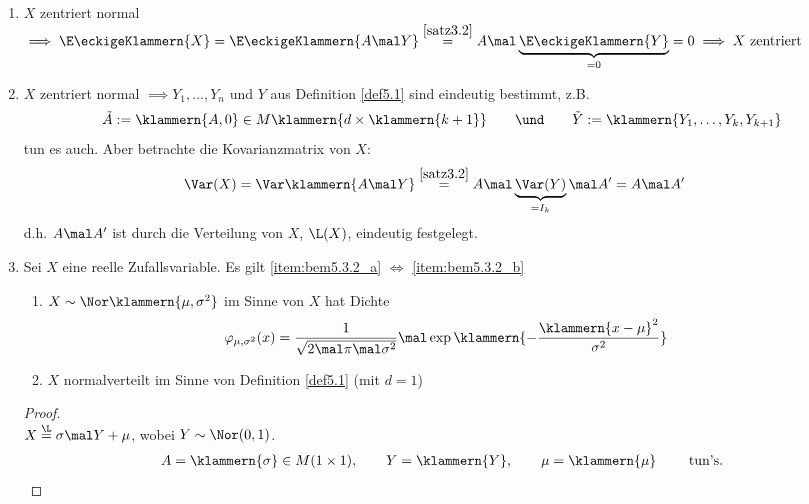 \begin{bemerkungnr}\label{bem5.3}\
	\begin{enumerate}[label=(\arabic*)]
		\item $X$ zentriert normal $\implies \E\eckigeKlammern{X}
			=
			\E\eckigeKlammern{A\mal Y}
			\overset{\ref{satz3.2}}{=}
			A\mal\underbrace{\E\eckigeKlammern{Y}}_{=0}
			=0
			\implies X\text{ zentriert}
		$
		\label{item:bem5.3_1}
		\item $X$ zentriert normal $\implies Y_1,\ldots,Y_n$ und $Y$ aus Definition \ref{def5.1} sind  eindeutig bestimmt, z.B.
		\begin{align*}
			\tilde{A}:=\klammern{A,0}\in M\klammern{d\times\klammern{k+1}}
			\qquad\und\qquad
			\tilde{Y}:=\klammern{Y_1,\ldots,Y_k,Y_{k+1}}
		\end{align*}
		tun es auch.
		Aber betrachte die Kovarianzmatrix von $X$:
		\begin{align*}
			\Var(X)
			&=\Var\klammern{A\mal Y}
			\overset{\ref{satz3.2}}{=}
			A\mal\underbrace{\Var(Y)}_{=I_k}\mal A'
			=A\mal A'
		\end{align*}
		d.h. $A\mal A'$ ist durch die Verteilung von $X$, $\L(X)$, eindeutig festgelegt.
		\label{item:bem5.3_2}
		\item Sei $X$ eine reelle Zufallsvariable. Es gilt \ref{item:bem5.3.2_a} $\iff$ \ref{item:bem5.3.2_b} 
		\label{item:bem5.3_3}
		\begin{enumerate}[label=(\alph*)]
			\item 
			$
				X\sim\Nor\klammern{\mu,\sigma^2}
			$
		im Sinne von $X$ hat Dichte
		\begin{align*}
			\varphi_{\mu,\sigma^2}(x)
			&=\frac{1}{\sqrt{2\mal\pi\mal\sigma^2}}\mal\exp\klammern{-\frac{\klammern{x-\mu}^2}{\sigma^2}}
		\end{align*}
			\label{item:bem5.3.2_a}
			\item $X$ normalverteilt im Sinne von Definition \ref{def5.1} (mit $d=1$)
			\label{item:bem5.3.2_b}
		\end{enumerate}
		
		\begin{proof}
			\\
			$X\overset{\L}{=}\sigma\mal Y+\mu$, wobei $Y\sim\Nor(0,1)$.
			\begin{align*}
				A=\klammern{\sigma}\in M(1\times 1),\qquad Y=\klammern{Y},\qquad \mu=\klammern{\mu}\qquad\text{ tun's.}
			\end{align*}
	

\end{proof}
\end{enumerate}
\end{bemerkungnr}
